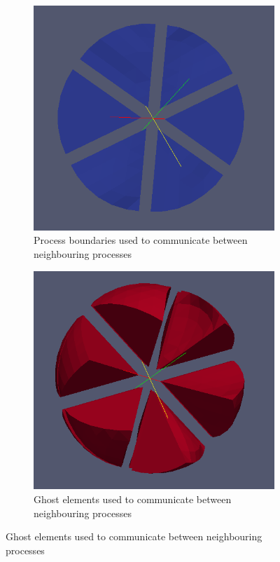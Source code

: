 \begin{figure}
	\begin{subfigure}[b]{0.33\textwidth} \hspace{4mm} \includegraphics[scale=0.22]{images/32-pb}    \captionsetup{width=0.8\textwidth} \caption{ Process boundaries used to communicate between neighbouring processes} \end{subfigure}
	\begin{subfigure}[b]{0.46\textwidth} \vspace{5mm} \hspace{12mm} \includegraphics[scale=0.25]{images/32-ghost} \captionsetup{width=0.6\textwidth} \caption{ Ghost elements used to communicate between neighbouring processes} \end{subfigure}

\end{figure}
